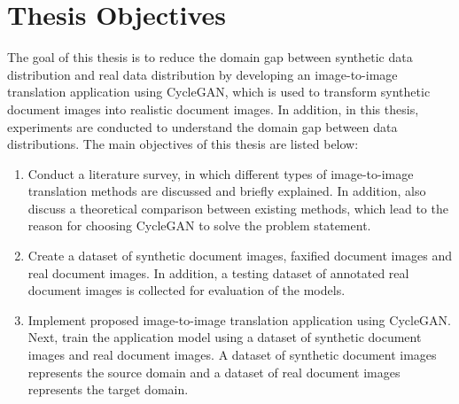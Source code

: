 \newpage
\section{Thesis Objectives}\label{thesisobjectives}
The goal of this thesis is to reduce the domain gap between synthetic data distribution and real data distribution by developing an image-to-image translation application using \ac{CycleGAN}, which is used to transform synthetic document images into realistic document images. In addition, in this thesis, experiments are conducted to understand the domain gap between data distributions. The main objectives of this thesis are listed below:
\begin{enumerate}
\item Conduct a literature survey, in which different types of image-to-image translation methods are discussed and briefly explained. In addition, also discuss a theoretical comparison between existing methods, which lead to the reason for choosing \ac{CycleGAN} to solve the problem statement. 

\item Create a dataset of synthetic document images, faxified document images and real document images. In addition, a testing dataset of annotated real document images is collected for evaluation of the models.

\item Implement proposed image-to-image translation application using \ac{CycleGAN}. Next, train the application model using a dataset of synthetic document images and real document images. A dataset of synthetic document images represents the source domain and a dataset of real document images represents the target domain.


\end{enumerate}
